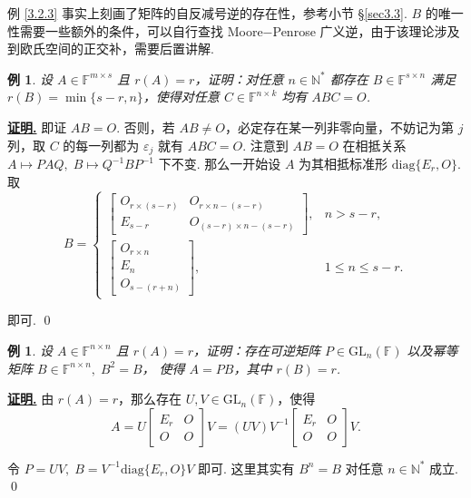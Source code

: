 \documentclass[10pt,openany]{article}
\theoremstyle{thmstyle} %
\theoremstyle{defstyle} %
\theoremstyle{prostyle} %
\theoremstyle{exastyle}
\newtheorem{example}[theorem]{例}
\theoremstyle{remstyle}
\renewenvironment{proof}[1][证明]{\par\underline{\textbf{#1.}} \;\fangsong}{\qed\par}
\newcommand{\F}{\mathbb{F}}
\newcommand{\gfn}{\text{GL}_n(\mathbb{F})}
\newcommand{\n}{^{n \times n}}
\newcommand{\diag}{\mathrm{diag}}
\begin{document}
例 \ref{3.2.3} 事实上刻画了矩阵的自反减号逆的存在性，参考小节 \S \ref{sec3.3}.  \( B \) 的唯一性需要一些额外的条件，可以自行查找 Moore\(-\)Penrose 广义逆，由于该理论涉及到欧氏空间的正交补，需要后置讲解.

\begin{example}
	设 \( A \in \F^{m \times s} \) 且 \( r(A)=r \)，证明：对任意 \( n \in \mathbb{N}^* \) 都存在 \( B \in \F^{s \times n} \) 满足 \( r(B)=\min\{s-r,n\} \)，使得对任意 \( C \in \F^{n \times k} \) 均有 \( ABC=O \).
\end{example}

\begin{proof}
	即证 \( AB=O \). 否则，若 \( AB \neq O \)，必定存在某一列非零向量，不妨记为第 \( j \) 列，取 \( C \) 的每一列都为 \( \varepsilon_j \) 就有 \( ABC=O \). 注意到 \( AB=O \) 在相抵关系 \( A \mapsto PAQ, \; B \mapsto Q^{-1}BP^{-1} \) 下不变. 那么一开始设 \( A \) 为其相抵标准形 \( \diag\{E_r,O\} \). 取
	\[ B=\left\{ \begin{array}{ll}
		\begin{bmatrix}
			O_{r \times (s-r)} & O_{r \times n-(s-r)} \\
			E_{s-r} & O_{(s-r) \times n-(s-r)}
		\end{bmatrix}, & n>s-r, \\[4ex]
		\begin{bmatrix}
			O_{r \times n} \\
			E_n \\
			O_{s-(r+n)}
		\end{bmatrix}, & 1 \leq n \leq s-r.
	\end{array}\right. \]
	
	即可.
\end{proof}

\begin{example} \label{3.2.5}
	设 \( A \in \F\n \) 且 \( r(A)=r \)，证明：存在可逆矩阵 \( P \in \gfn \) 以及幂等矩阵 \( B \in \F\n, \; B^2=B \)， 使得 \( A=PB \)，其中 \( r(B)=r \).
\end{example}

\begin{proof}
	由 \( r(A)=r \)，那么存在 \( U,V \in \gfn \)，使得 
	\[ A=U\begin{bmatrix}
		E_r & O \\ O & O
	\end{bmatrix}V=(UV)V^{-1}\begin{bmatrix}
	E_r & O \\ O & O
	\end{bmatrix}V. \]
	
	令 \( P=UV, \; B=V^{-1}\diag\{E_r,O\}V \) 即可. 这里其实有 \( B^n=B \) 对任意 \( n \in \mathbb{N}^* \) 成立.
\end{proof}
\end{document}
